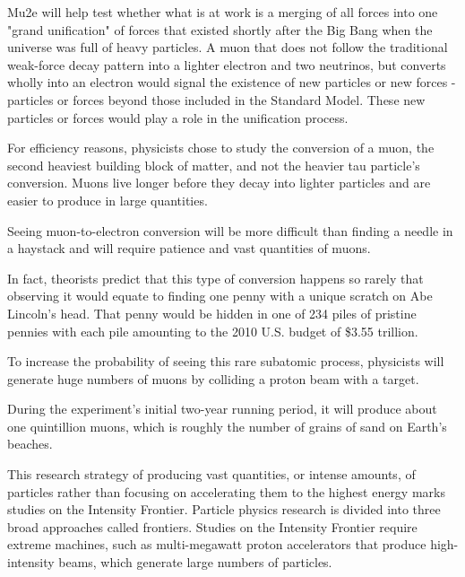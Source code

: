 
Mu2e will help test whether what is at work is a merging of all forces into one "grand unification" of forces that existed shortly after the Big Bang when the universe was full of heavy particles. A muon that does not follow the traditional weak-force decay pattern into a lighter electron and two neutrinos, but converts wholly into an electron would signal the existence of new particles or new forces - particles or forces beyond those included in the Standard Model. These new particles or forces would play a role in the unification process.

For efficiency reasons, physicists chose to study the conversion of a muon, the second heaviest building block of matter, and not the heavier tau particle's conversion. Muons live longer before they decay into lighter particles and are easier to produce in large quantities.

Seeing muon-to-electron conversion will be more difficult than finding a needle in a haystack and will require patience and vast quantities of muons.

In fact, theorists predict that this type of conversion happens so rarely that observing it would equate to finding one penny with a unique scratch on Abe Lincoln's head. That penny would be hidden in one of 234 piles of pristine pennies with each pile amounting to the 2010 U.S. budget of \$3.55 trillion.

To increase the probability of seeing this rare subatomic process, physicists will generate huge numbers of muons by colliding a proton beam with a target.

During the experiment's initial two-year running period, it will produce about one quintillion muons, which is roughly the number of grains of sand on Earth's beaches.

This research strategy of producing vast quantities, or intense amounts, of particles rather than focusing on accelerating them to the highest energy marks studies on the Intensity Frontier. Particle physics research is divided into three broad approaches called frontiers. Studies on the Intensity Frontier require extreme machines, such as multi-megawatt proton accelerators that produce high-intensity beams, which generate large numbers of particles.

